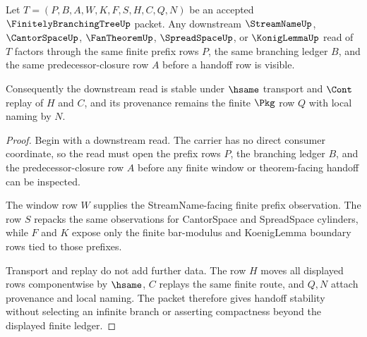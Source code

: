 \begin{theorem}
\label{thm:finitely-branching-tree-finite-window-handoffs}
Let $T=(P,B,A,W,K,F,S,H,C,Q,N)$ be an accepted $\FinitelyBranchingTreeUp$ packet. Any downstream $\StreamNameUp$, $\CantorSpaceUp$, $\FanTheoremUp$, $\SpreadSpaceUp$, or $\KonigLemmaUp$ read of $T$ factors through the same finite prefix rows $P$, the same branching ledger $B$, and the same predecessor-closure row $A$ before a handoff row is visible.

Consequently the downstream read is stable under $\hsame$ transport and $\Cont$ replay of $H$ and $C$, and its provenance remains the finite $\Pkg$ row $Q$ with local naming by $N$.
\end{theorem}
\begin{proof}
Begin with a downstream read. The carrier has no direct consumer coordinate, so the read must open the prefix rows $P$, the branching ledger $B$, and the predecessor-closure row $A$ before any finite window or theorem-facing handoff can be inspected.

The window row $W$ supplies the StreamName-facing finite prefix observation. The row $S$ repacks the same observations for CantorSpace and SpreadSpace cylinders, while $F$ and $K$ expose only the finite bar-modulus and KoenigLemma boundary rows tied to those prefixes.

Transport and replay do not add further data. The row $H$ moves all displayed rows componentwise by $\hsame$, $C$ replays the same finite route, and $Q,N$ attach provenance and local naming. The packet therefore gives handoff stability without selecting an infinite branch or asserting compactness beyond the displayed finite ledger.
\end{proof}



